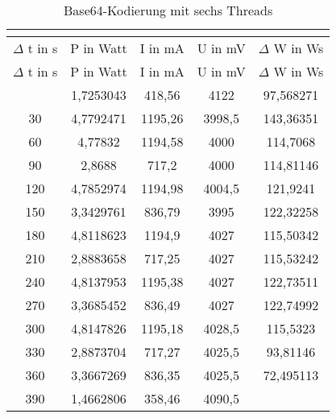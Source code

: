 \begin{longtable}[c]{ccccc}
\caption{Base64-Kodierung mit sechs Threads} \\
\label{tab:Base64MessungThreadSechs}\\
\hline
{$\Delta$ t in s} & {P in Watt} & {I in mA} & {U in mV} & {$\Delta$ W in Ws} \\
\hline
\endfirsthead
\hline
$\Delta$ t in s & P in Watt & I in mA & U in mV & $\Delta$ W in Ws \\
\hline
\endhead
\hline
\endfoot
\hline
       \midrule
    0     & 1,7253043 & 418,56 & 4122  & 97,568271 \\
    \midrule
    30    & 4,7792471 & 1195,26 & 3998,5 & 143,36351 \\
    \midrule
    60    & 4,77832 & 1194,58 & 4000  & 114,7068 \\
    \midrule
    90    & 2,8688 & 717,2 & 4000  & 114,81146 \\
    \midrule
    120   & 4,7852974 & 1194,98 & 4004,5 & 121,9241 \\
    \midrule
    150   & 3,3429761 & 836,79 & 3995  & 122,32258 \\
    \midrule
    180   & 4,8118623 & 1194,9 & 4027  & 115,50342 \\
    \midrule
    210   & 2,8883658 & 717,25 & 4027  & 115,53242 \\
    \midrule
    240   & 4,8137953 & 1195,38 & 4027  & 122,73511 \\
    \midrule
    270   & 3,3685452 & 836,49 & 4027  & 122,74992 \\
    \midrule
    300   & 4,8147826 & 1195,18 & 4028,5 & 115,5323 \\
    \midrule
    330   & 2,8873704 & 717,27 & 4025,5 & 93,81146 \\
    \midrule
    360   & 3,3667269 & 836,35 & 4025,5 & 72,495113 \\
    \midrule
    390   & 1,4662806 & 358,46 & 4090,5 &  \\
\end{longtable}


